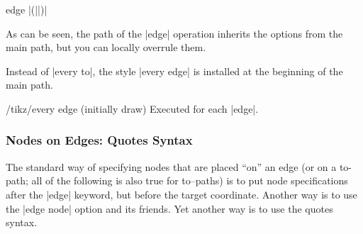 \begin{pathoperation}{edge}{  |(||)|}
\begin{codeexample}[]
\end{codeexample}

    As can be seen, the path of the |edge| operation inherits the options from
    the main path, but you can locally overrule them.
\begin{codeexample}[]
\end{codeexample}

    Instead of |every to|, the style |every edge| is installed at the beginning
    of the main path.
    \begin{stylekey}{/tikz/every edge (initially draw)}
        Executed for each |edge|.
\begin{codeexample}[]
\end{codeexample}
    \end{stylekey}
\end{pathoperation}


\subsubsection{Nodes on Edges: Quotes Syntax}
\label{section-edge-quotes}

The standard way of specifying nodes that are placed ``on'' an edge (or on a
to-path; all of the following is also true for to--paths) is to put node
specifications after the |edge| keyword, but before the target coordinate.
Another way is to use the |edge node| option and its friends. Yet another way
is to use the quotes syntax.

